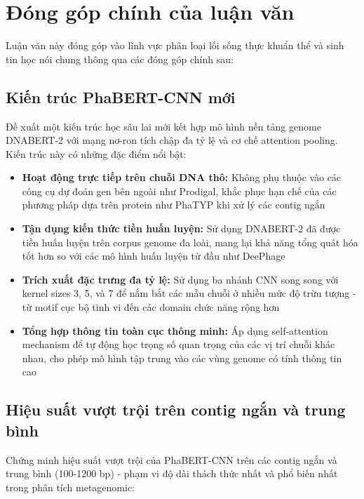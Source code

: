 \section{Đóng góp chính của luận văn}
\label{sec:contributions}

Luận văn này đóng góp vào lĩnh vực phân loại lối sống thực khuẩn thể và sinh tin học nói chung thông qua các đóng góp chính sau:

\subsection{Kiến trúc PhaBERT-CNN mới}

Đề xuất một kiến trúc học sâu lai mới kết hợp mô hình nền tảng genome DNABERT-2 với mạng nơ-ron tích chập đa tỷ lệ và cơ chế attention pooling. Kiến trúc này có những đặc điểm nổi bật:

\begin{itemize}
    \item \textbf{Hoạt động trực tiếp trên chuỗi DNA thô:} Không phụ thuộc vào các công cụ dự đoán gen bên ngoài như Prodigal, khắc phục hạn chế của các phương pháp dựa trên protein như PhaTYP khi xử lý các contig ngắn

    \item \textbf{Tận dụng kiến thức tiền huấn luyện:} Sử dụng DNABERT-2 đã được tiền huấn luyện trên corpus genome đa loài, mang lại khả năng tổng quát hóa tốt hơn so với các mô hình huấn luyện từ đầu như DeePhage

    \item \textbf{Trích xuất đặc trưng đa tỷ lệ:} Sử dụng ba nhánh CNN song song với kernel sizes 3, 5, và 7 để nắm bắt các mẫu chuỗi ở nhiều mức độ trừu tượng - từ motif cục bộ tinh vi đến các domain chức năng rộng hơn

    \item \textbf{Tổng hợp thông tin toàn cục thông minh:} Áp dụng self-attention mechanism để tự động học trọng số quan trọng của các vị trí chuỗi khác nhau, cho phép mô hình tập trung vào các vùng genome có tính thông tin cao
\end{itemize}

\subsection{Hiệu suất vượt trội trên contig ngắn và trung bình}

Chứng minh hiệu suất vượt trội của PhaBERT-CNN trên các contig ngắn và trung bình (100-1200 bp) - phạm vi độ dài thách thức nhất và phổ biến nhất trong phân tích metagenomic:


